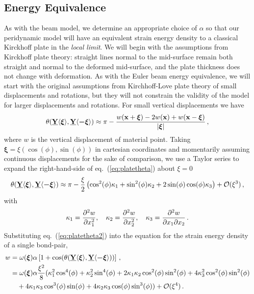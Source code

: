 \subsection{Energy Equivalence}
%
As with the beam model, we determine an appropriate choice of $\alpha$ so that our peridynamic model will have an equivalent strain energy density to a classical Kirckhoff plate in the \emph{local limit}.  We will begin with the assumptions from Kirckhoff plate theory: straight lines normal to the mid-surface remain both straight and normal to the deformed mid-surface, and the plate thickness does not change with deformation.  As with the Euler beam energy equivalence, we will start with the original assumptions from Kirchhoff-Love plate theory of small displacements and rotations, but they will not constrain the validity of the model for larger displacements and rotations.  For small vertical displacements we have
%
\begin{equation}
    \theta(\vstate{Y}{}{\boldsymbol{\xi}},\vstate{Y}{}{\boldsymbol{-\xi}}) \approx \pi-\frac{w(\mathbf{x}+\boldsymbol{\xi})-2w(\mathbf{x})+w(\mathbf{x}-\boldsymbol{\xi})}{|\boldsymbol{\xi}|}\, ,
    \label{eq:platetheta}
\end{equation}
%
where $w$ is the vertical displacement of material point.  Taking \(\boldsymbol{\xi}=\xi (\cos(\phi),\sin(\phi))\) in cartesian coordinates and momentarily assuming continuous displacements for the sake of comparison, we use a Taylor series to expand the right-hand-side of eq.~(\ref{eq:platetheta}) about \(\xi = 0\) 
%
\begin{equation}
    \theta(\vstate{Y}{}{\boldsymbol{\xi}},\vstate{Y}{}{\boldsymbol{-\xi}}) \approx \pi-\frac{\xi}{2} \left(\cos^2(\phi) \kappa_1+\sin^2(\phi) \kappa_2+2\sin(\phi)\cos(\phi)\kappa_3\right)+\mathcal{O}(\xi^3)\, ,
    \label{eq:platetheta2}
\end{equation}
%
with
%
\begin{equation}
    \kappa_1=\frac{\partial^2 w}{\partial x_1^2}, \quad \kappa_2= \frac{\partial^2 w}{\partial x_2^2}, \quad \kappa_3=\frac{\partial^2 w}{\partial x_1\partial x_2}\,.\notag
\end{equation}
%
Substituting eq.~(\ref{eq:platetheta2}) into the equation for the strain energy density of a single bond-pair,
%
\begin{align}
    w &= \omega(\boldsymbol{\xi}) \alpha \left[1+\cos(\theta(\vstate{Y}{}{\boldsymbol{\xi}},\vstate{Y}{}{\boldsymbol{-\xi}}) ) \right]\, , \notag \\
    &= \omega(\boldsymbol{\xi}) \alpha\frac{\xi^2}{8}(\kappa_1^2\cos^4(\phi)+\kappa_2^2\sin^4(\phi)+2\kappa_1\kappa_2\cos^2(\phi)\sin^2(\phi)+4\kappa_3^2\cos^2(\phi)\sin^2(\phi) \notag \\
    & \quad + 4\kappa_1\kappa_3\cos^3(\phi)\sin(\phi)+4\kappa_2\kappa_3\cos(\phi)\sin^3(\phi))+\mathcal{O}(\xi^4)\, .\notag
\end{align}
